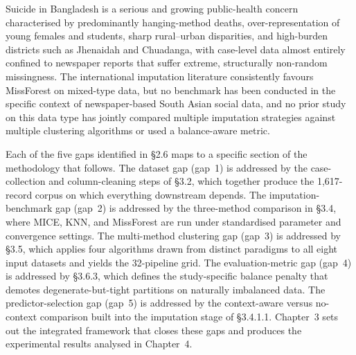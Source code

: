Suicide in Bangladesh is a serious and growing public-health concern characterised by predominantly hanging-method deaths, over-representation of young females and students, sharp rural--urban disparities, and high-burden districts such as Jhenaidah and Chuadanga, with case-level data almost entirely confined to newspaper reports that suffer extreme, structurally non-random missingness. The international imputation literature consistently favours MissForest on mixed-type data, but no benchmark has been conducted in the specific context of newspaper-based South Asian social data, and no prior study on this data type has jointly compared multiple imputation strategies against multiple clustering algorithms or used a balance-aware metric.

Each of the five gaps identified in \S2.6 maps to a specific section of the methodology that follows. The dataset gap (gap~1) is addressed by the case-collection and column-cleaning steps of \S3.2, which together produce the 1{,}617-record corpus on which everything downstream depends. The imputation-benchmark gap (gap~2) is addressed by the three-method comparison in \S3.4, where MICE, KNN, and MissForest are run under standardised parameter and convergence settings. The multi-method clustering gap (gap~3) is addressed by \S3.5, which applies four algorithms drawn from distinct paradigms to all eight input datasets and yields the 32-pipeline grid. The evaluation-metric gap (gap~4) is addressed by \S3.6.3, which defines the study-specific balance penalty that demotes degenerate-but-tight partitions on naturally imbalanced data. The predictor-selection gap (gap~5) is addressed by the context-aware versus no-context comparison built into the imputation stage of \S3.4.1.1. Chapter~3 sets out the integrated framework that closes these gaps and produces the experimental results analysed in Chapter~4.
